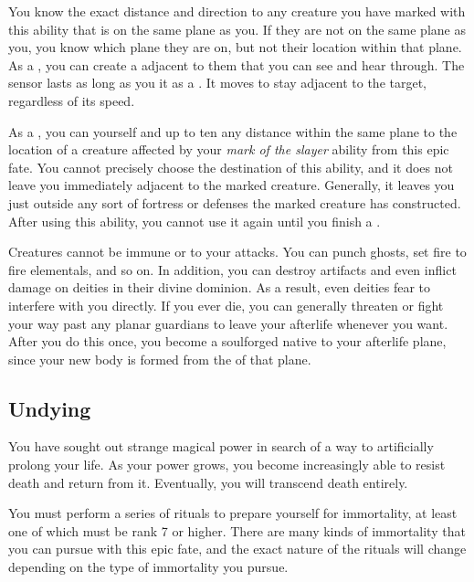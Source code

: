       You know the exact distance and direction to any creature you have marked with this ability that is on the same plane as you.
      If they are not on the same plane as you, you know which plane they are on, but not their location within that plane.
      As a , you can create a  adjacent to them that you can see and hear through.
      The sensor lasts as long as you  it as a .
      It moves to stay adjacent to the target, regardless of its speed.

       As a , you can  yourself and up to ten  any distance within the same plane to the location of a creature affected by your \textit{mark of the slayer} ability from this epic fate.
      You cannot precisely choose the destination of this ability, and it does not leave you immediately adjacent to the marked creature.
      Generally, it leaves you just outside any sort of fortress or defenses the marked creature has constructed.
      After using this ability, you cannot use it again until you finish a .

      Creatures cannot be immune or  to your attacks.
      You can punch ghosts, set fire to fire elementals, and so on.
      In addition, you can destroy artifacts and even inflict damage on deities in their divine dominion.
      As a result, even deities fear to interfere with you directly.
      If you ever die, you can generally threaten or fight your way past any planar guardians to leave your afterlife whenever you want.
      After you do this once, you become a soulforged native to your afterlife plane, since your new body is formed from the  of that plane.

  \subsection{Undying}
    You have sought out strange magical power in search of a way to artificially prolong your life.
    As your power grows, you become increasingly able to resist death and return from it.
    Eventually, you will transcend death entirely.

     You must perform a series of rituals to prepare yourself for immortality, at least one of which must be rank 7 or higher. There are many kinds of immortality that you can pursue with this epic fate, and the exact nature of the rituals will change depending on the type of immortality you pursue.

